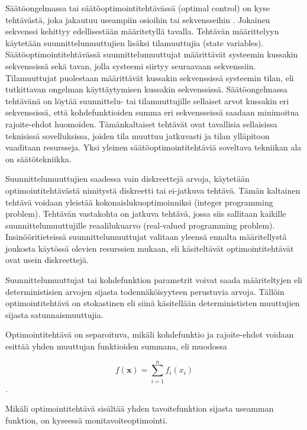\documentclass[12pt]{article}
\newenvironment{content}{\pagenumbering{arabic}}{}
\begin{document}
\begin{content}
Säätöongelmassa tai säätöoptimointitehtävässä (optimal control) on kyse tehtävästä, joka jakautuu useampiin osioihin tai sekvensseihin . Jokainen sekvenssi kehittyy edellisestään määritetyllä tavalla. Tehtävän määrittelyyn käytetään suunnittelumuuttujien lisäksi tilamuuttujia (state variables). Säätöoptimointitehtävässä suunnittelumuuttujat määrittävät systeemin kussakin sekvenssissä sekä tavan, jolla systeemi siirtyy seuraavaan sekvenssiin. Tilamuuttujat puolestaan määrittävät kussakin sekvenssissä systeemin tilan, eli tutkittavan ongelman käyttäytymisen kussakin sekvenssissä. Säätöongelmassa tehtävänä on löytää suunnittelu- tai tilamuuttujille sellaiset arvot kussakin eri sekvenssissä, että kohdefunktioiden summa eri sekvensseissä saadaan minimoitua rajoite-ehdot huomoiden. \parencite[19]{rao} Tämänkaltaiset tehtävät ovat tavallisia sellaisissa teknisissä sovelluksissa, joiden tila muuttuu jatkuvasti ja tilan ylläpitoon vaaditaan resursseja. Yksi yleinen säätöoptimointitehtäviä soveltava tekniikan ala on säätötekniikka.

Suunnittelumuuttujien saadessa vain diskreettejä arvoja, käytetään optimointitehtävästä nimitystä diskreetti tai ei-jatkuva tehtävä. Tämän kaltainen tehtävä voidaan yleistää kokonaislukuoptimoinniksi (integer programming problem). Tehtävän vastakohta on jatkuva tehtävä, jossa siis sallitaan kaikille suunnittelumuuttujille reaalilukuarvo (real-valued programming problem). \parencite[28]{rao} Insinööritieteissä suunnittelumuuttujat valitaan yleensä ennalta määritellystä joukosta käytössä olevien resurssien mukaan, eli käsiteltävät optimointitehtävät ovat usein diskreettejä. 

Suunnittelumuuttujat tai kohdefunktion parametrit voivat saada määriteltyjen eli deterministisien arvojen sijasta todennäköisyyteen perustuvia arvoja. Tällöin optimointitehtävä on stokastinen eli siinä käsitellään determinististen muuttujien sijasta satunnaismuuttujia. \parencite[29]{rao} 

Optimointitehtävä on separoituva, mikäli kohdefunktio ja rajoite-ehdot voidaan esittää yhden muuttujan funktioiden summana, eli muodossa 

\begin{equation}
\label{separoituva_funktio}
f(\textbf{x}) = \sum_{i=1}^n f_i(x_i)
\end{equation}.

Mikäli optimointitehtävä sisältää yhden tavoitefunktion sijasta useamman funktion, on kyseessä monitavoiteoptimointi. 





\end{content}
\end{document}
